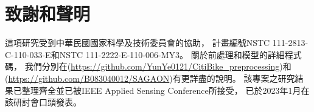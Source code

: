 \documentclass[a4paper,12pt]{extarticle}
\begin{document}
    \newpage
    \section{致謝和聲明}
        
        這項研究受到中華民國國家科學及技術委員會的協助，
        計畫編號NSTC 111-2813-C-110-033-E和NSTC 111-2222-E-110-006-MY3。
        關於前處理和模型的詳細程式碼，
        我們分別在(\url{https://github.com/YunYe0121/CitiBike_preprocessing})和(\url{https://github.com/B083040012/SAGAON})有更詳盡的說明。
        該專案之研究結果已整理齊全並已被IEEE Applied Sensing Conference\cite{SAGAON}所接受，
        已於2023年1月在該研討會口頭發表。

    \clearpage
        \renewcommand\refname{\arabic{section}\hspace{1em}參考文獻}
        
        
\end{document}
